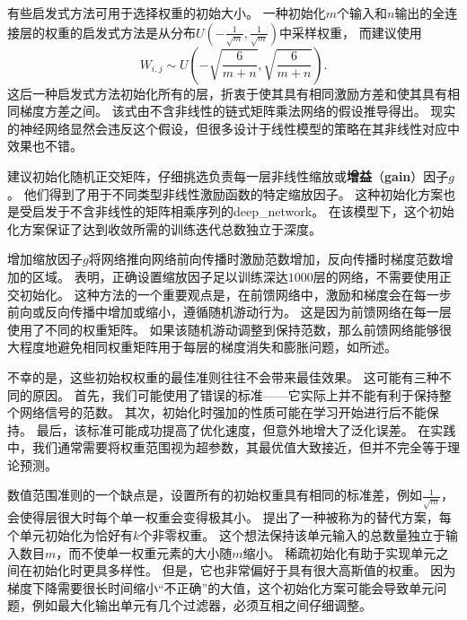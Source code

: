 有些启发式方法可用于选择权重的初始大小。
一种初始化$m$个输入和$n$输出的全连接层的权重的启发式方法是从分布$U(-\frac{1}{\sqrt{m}}, \frac{1}{\sqrt{m}})$中采样权重，
而\cite{Glorot+al-AI-2011-small}建议使用
\begin{equation}
    W_{i,j} \sim U \left(-\sqrt{\frac{6}{m+n}}, \sqrt{\frac{6}{m+n}}\right) .
\end{equation}
这后一种启发式方法初始化所有的层，折衷于使其具有相同激励方差和使其具有相同梯度方差之间。
该式由不含非线性的链式矩阵乘法网络的假设推导得出。
现实的神经网络显然会违反这个假设，但很多设计于线性模型的策略在其非线性对应中效果也不错。


\cite{Saxe-et-al-ICLR13}建议初始化随机正交矩阵，仔细挑选负责每一层非线性缩放或\textbf{增益}（\textbf{gain}）因子$g$。
他们得到了用于不同类型非线性激励函数的特定缩放因子。
这种初始化方案也是受启发于不含非线性的矩阵相乘序列的\gls{deep_network}。
在该模型下，这个初始化方案保证了达到收敛所需的训练迭代总数独立于深度。

增加缩放因子$g$将网络推向网络前向传播时激励范数增加，反向传播时梯度范数增加的区域。
\cite{Sussillo14}表明，正确设置缩放因子足以训练深达$1000$层的网络，不需要使用正交初始化。
这种方法的一个重要观点是，在前馈网络中，激励和梯度会在每一步前向或反向传播中增加或缩小，遵循随机游动行为。
这是因为前馈网络在每一层使用了不同的权重矩阵。
如果该随机游动调整到保持范数，那么前馈网络能够很大程度地避免相同权重矩阵用于每层的梯度消失和膨胀问题，如所述。

不幸的是，这些初始权权重的最佳准则往往不会带来最佳效果。
这可能有三种不同的原因。
首先，我们可能使用了错误的标准——它实际上并不能有利于保持整个网络信号的范数。
其次，初始化时强加的性质可能在学习开始进行后不能保持。
最后，该标准可能成功提高了优化速度，但意外地增大了泛化误差。
在实践中，我们通常需要将权重范围视为超参数，其最优值大致接近，但并不完全等于理论预测。


数值范围准则的一个缺点是，设置所有的初始权重具有相同的标准差，例如$\frac{1}{\sqrt{m}}$，会使得层很大时每个单一权重会变得极其小。
\cite{martens2010hessian-small}提出了一种被称为的替代方案，每个单元初始化为恰好有$k$个非零权重。
这个想法保持该单元输入的总数量独立于输入数目$m$，而不使单一权重元素的大小随$m$缩小。
稀疏初始化有助于实现单元之间在初始化时更具多样性。
但是，它也非常偏好于具有很大高斯值的权重。
因为梯度下降需要很长时间缩小``不正确''的大值，这个初始化方案可能会导致单元问题，例如最大化输出单元有几个过滤器，必须互相之间仔细调整。

